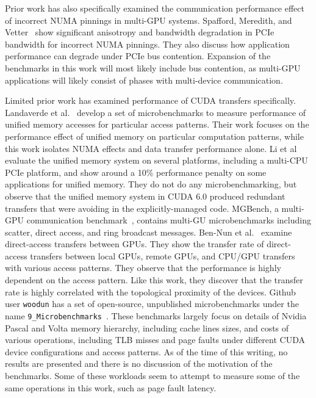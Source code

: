 Prior work has also specifically examined the communication performance effect of incorrect NUMA pinnings in multi-GPU systems.
Spafford, Meredith, and Vetter~\cite{spafford2011quantifying} show significant anisotropy and bandwidth degradation in PCIe bandwidth for incorrect NUMA pinnings.
They also discuss how application performance can degrade under PCIe bus contention.
Expansion of the benchmarks in this work will most likely include bus contention, as multi-GPU applications will likely consist of phases with multi-device communication.

Limited prior work has examined performance of CUDA transfers specifically.
Landaverde et al.~\cite{landaverde2014investigation} develop a set of microbenchmarks to measure performance of unified memory accesses for particular access patterns.
Their work focuses on the performance effect of unified memory on particular computation patterns, while this work isolates  NUMA effects and data transfer performance alone.
Li et al~\cite{li2015evaluation} evaluate the unified memory system on several platforms, including a multi-CPU PCIe platform, and show around a 10\% performance penalty on some applications for unified memory.
They do not do any microbenchmarking, but observe that the unified memory system in CUDA 6.0 produced redundant transfers that were avoiding in the explicitly-managed code.
MGBench, a multi-GPU communication benchmark~\cite{bennun2016mgbench}, contains multi-GU microbenchmarks including scatter, direct access, and ring broadcast messages.
Ben-Nun et al.~\cite{ben2017groute} examine direct-access transfers between GPUs.
They show the transfer rate of direct-access transfers between local GPUs, remote GPUs, and CPU/GPU transfers with various access patterns.
They observe that the performance is highly dependent on the access pattern.
Like this work, they discover that the transfer rate is highly correlated with the topological proximity of the devices.
Github user \texttt{woodun} has a set of open-source, unpublished microbenchmarks under the name \texttt{9\_Microbenchmarks}~\cite{woodun2018microbenchmarks}.
These benchmarks largely focus on details of Nvidia Pascal and Volta memory hierarchy, including cache lines sizes, and costs of various operations, including TLB misses and page faults under different CUDA device configurations and access patterns.
As of the time of this writing, no results are presented and there is no discussion of the motivation of the benchmarks.
Some of these workloads seem to attempt to measure some of the same operations in this work, such as page fault latency.


